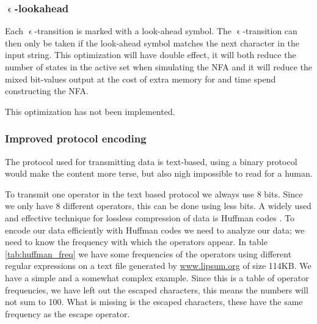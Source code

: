 \subsubsection{$\upvarepsilon$-lookahead}

Each $\upvarepsilon$-transition is marked with a look-ahead
symbol. The $\upvarepsilon$-transition can then only be taken if the
look-ahead symbol matches the next character in the input string. This
optimization will have double effect, it will both reduce the number
of states in the active set when simulating the NFA and it will reduce
the mixed bit-values output at the cost of extra memory for and time
spend constructing the NFA.

This optimization has not been implemented.

\subsubsection{Improved protocol encoding}
The protocol used for transmitting data is text-based, using a binary
protocol would make the content more terse, but also nigh impossible
to read for a human. 

To transmit one operator in the text based protocol we always use 8
bits. Since we only have 8 different operators, this can be done using
less bits. A widely used and effective technique for lossless
compression of data is Huffman codes \cite{Cormen}. To encode our data
efficiently with Huffman codes we need to analyze our data; we need to
know the frequency with which the operators appear. In table
\vref{tab:huffman_freq} we have some frequencies of the operators
using different regular expressions on a text file generated by
\url{www.lipsum.org} of size 114KB. We have a simple and a somewhat
complex example. Since this is a table of operator frequencies, we
have left out the escaped characters, this means the numbers will not
sum to 100. What is missing is the escaped characters, these have the
same frequency as the escape operator.


